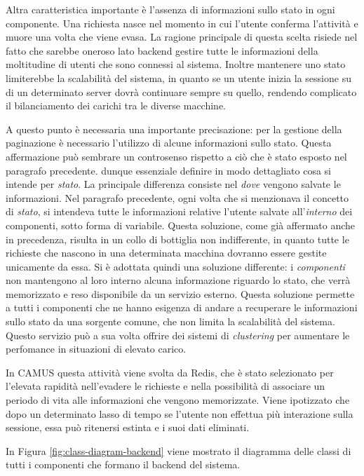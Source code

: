 Altra caratteristica importante è l'assenza di informazioni sullo stato in ogni componente. Una richiesta nasce nel momento in cui l'utente conferma l'attività e muore una volta che viene evasa. La ragione principale di questa scelta risiede nel fatto che sarebbe oneroso lato backend gestire tutte le informazioni della moltitudine di utenti che sono connessi al sistema. Inoltre mantenere uno stato limiterebbe la scalabilità del sistema, in quanto se un utente inizia la sessione su di un determinato server dovrà continuare sempre su quello, rendendo complicato il bilanciamento dei carichi tra le diverse macchine.

A questo punto è necessaria una importante precisazione: per la gestione della paginazione è necessario l'utilizzo di alcune informazioni sullo stato. Questa affermazione può sembrare un controsenso rispetto a ciò che è stato esposto nel paragrafo precedente. \upe dunque essenziale definire in modo dettagliato cosa si intende per \emph{stato}. La principale differenza consiste nel \emph{dove} vengono salvate le informazioni. Nel paragrafo precedente, ogni volta che si menzionava il concetto di \emph{stato}, si intendeva tutte le informazioni relative l'utente salvate all'\emph{interno} dei componenti, sotto forma di variabile. Questa soluzione, come già affermato anche in precedenza, risulta in un collo di bottiglia non indifferente, in quanto tutte le richieste che nascono in una determinata macchina dovranno essere gestite unicamente da essa. Si è adottata quindi una soluzione differente: i \emph{componenti} non mantengono al loro interno alcuna informazione riguardo lo stato, che verrà memorizzato e reso disponibile da un servizio esterno. Questa soluzione permette a tutti i componenti che ne hanno esigenza di andare a recuperare le informazioni sullo stato da una sorgente comune, che non limita la scalabilità del sistema. Questo servizio può a sua volta offrire dei sistemi di \emph{clustering} per aumentare le perfomance in situazioni di elevato carico.

In CAMUS questa attività viene svolta da Redis, che è stato selezionato per l'elevata rapidità nell'evadere le richieste e nella possibilità di associare un periodo di vita alle informazioni che vengono memorizzate. Viene ipotizzato che dopo un determinato lasso di tempo se l'utente non effettua più interazione sulla sessione, essa può ritenersi estinta e i suoi dati eliminati.

In Figura \ref{fig:class-diagram-backend} viene mostrato il diagramma delle classi di tutti i componenti che formano il backend del sistema.

